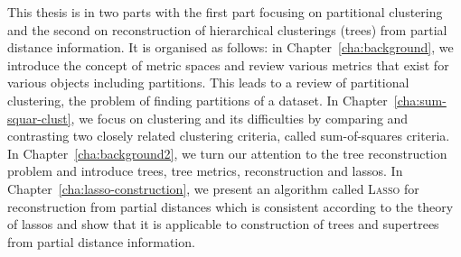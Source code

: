 This thesis is in two parts with the first part focusing on partitional
clustering and the second on reconstruction of hierarchical clusterings
(trees) from partial distance information.  It is organised as follows: in
Chapter~\ref{cha:background}, we introduce the concept of metric spaces and
review various metrics that exist for various objects including partitions.
This leads to a review of partitional clustering, the problem of finding
partitions of a dataset.  In Chapter~\ref{cha:sum-squar-clust}, we focus on
clustering and its difficulties by comparing and contrasting two closely
related clustering criteria, called sum-of-squares criteria.  In
Chapter~\ref{cha:background2}, we turn our attention to the tree
reconstruction problem and introduce trees, tree metrics, reconstruction and
lassos.  In Chapter~\ref{cha:lasso-construction}, we present an algorithm
called \textsc{Lasso} for reconstruction from partial distances which is
consistent according to the theory of lassos and show that it is applicable to
construction of trees and supertrees from partial distance information.

